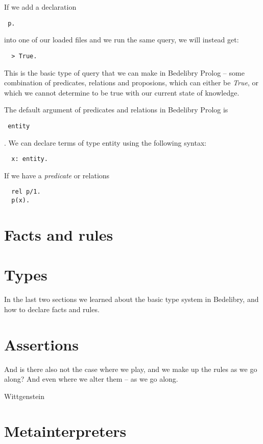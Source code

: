 \documentclass{book}
\begin{document}
If we add a declaration \begin{verbatim} p. \end{verbatim} into one of our loaded files and we run the same query, we will instead get:

\begin{verbatim}
  > True.
\end{verbatim}

This is the basic type of query that we can make in Bedelibry Prolog -- some combination of predicates, relations and proposions, which can either be \textit{True}, or which we cannot determine to be true with our current state of knowledge.

The default argument of predicates and relations in Bedelibry Prolog is \begin{verbatim} entity \end{verbatim}. We can declare terms of type entity using the following syntax:

\begin{verbatim}
  x: entity.
\end{verbatim}

If we have a \textit{predicate} or relations

\begin{verbatim}
  rel p/1.
  p(x).
\end{verbatim}

\section{Facts and rules}



\section{Types}

In the last two sections we learned about the basic type system in Bedelibry, and how to declare facts and rules.

\section{Assertions}
\epigraph{And is there also not the case where we play, and we make up the rules as we go along? And even where we alter them -- as we go along.}{Wittgenstein}

\section{Metainterpreters}
\end{document}
